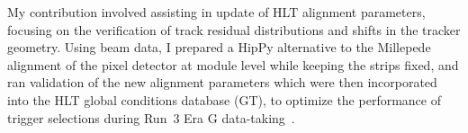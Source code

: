 My contribution involved assisting in update of HLT alignment parameters, focusing on the verification of track residual distributions and shifts in the tracker geometry. Using beam data, I prepared a HipPy alternative to the Millepede alignment of the pixel detector at module level while keeping the strips fixed, and ran validation of the new alignment parameters which were then incorporated into the HLT global conditions database (GT), to optimize the performance of trigger selections during Run~3 Era G data-taking~\cite{WeeklyTr24:online}.





